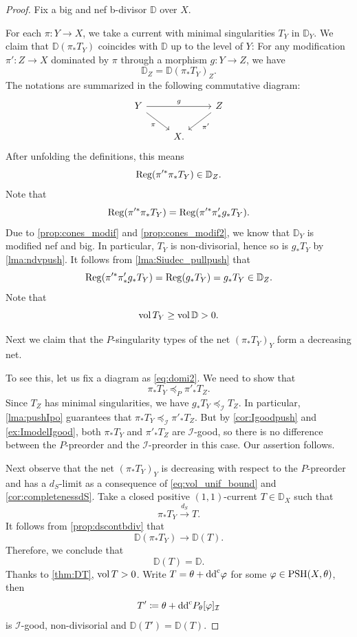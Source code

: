 \begin{proof}
    Fix a big and nef b-divisor $\mathbb{D}$ over $X$.

    For each $\pi\colon Y\rightarrow X$, we take a current with minimal singularities $T_Y$ in $\mathbb{D}_Y$.
    We claim that $\mathbb{D}(\pi_*T_Y)$ coincides with $\mathbb{D}$ up to the level of $Y$: For any modification $\pi'\colon Z\rightarrow X$ dominated by $\pi$ through a morphism $g\colon Y\rightarrow Z$, we have
    \[
    \mathbb{D}_Z=\mathbb{D}(\pi_*T_Y)_Z.
    \]
    The notations are summarized in the following commutative diagram:
    \begin{equation}\label{eq:domi2}
    \begin{tikzcd}
Y \arrow[rr,"g"] \arrow[rd, "\pi"'] &   & Z \arrow[ld, "\pi'"] \\
                                 & X. &
\end{tikzcd}
    \end{equation}
    After unfolding the definitions, this means
    \[
        \operatorname{Reg}(\pi'^*\pi_*T_Y)\in \mathbb{D}_Z.
    \]
    Note that
    \[
        \operatorname{Reg}(\pi'^*\pi_*T_Y)=\operatorname{Reg}(\pi'^* \pi'_* g_*T_Y).
    \]
    Due to \cref{prop:cones_modif} and \cref{prop:cones_modif2}, we know that $\mathbb{D}_Y$ is modified nef and big. In particular, $T_Y$ is non-divisorial, hence so is $g_*T_Y$ by \cref{lma:ndvpush}. It follows from \cref{lma:Siudec_pullpush} that
    \[
    \operatorname{Reg}(\pi'^* \pi'_* g_*T_Y)=\operatorname{Reg}(g_*T_Y)=g_*T_Y\in \mathbb{D}_Z.
    \]
    Note that
    \begin{equation}\label{eq:vol_unif_bound}
    \operatorname{vol} T_Y\geq \operatorname{vol} \mathbb{D}>0.
    \end{equation}

    Next we claim that the $P$-singularity types of the net $(\pi_*T_Y)_Y$ form a decreasing net.

    To see this, let us fix a diagram as \eqref{eq:domi2}. We need to show that
    \[
    \pi_*T_Y\preceq_P \pi'_*T_Z.
    \]
    Since $T_Z$ has minimal singularities, we have $g_*T_Y\preceq_{\mathcal{I}} T_Z$. In particular, \cref{lma:pushIpo} guarantees that $\pi_*T_Y\preceq_{\mathcal{I}} \pi'_*T_Z$.
    But by \cref{cor:Igoodpush} and \cref{ex:ImodelIgood}, both $\pi_*T_Y$ and $\pi'_*T_Z$ are $\mathcal{I}$-good, so there is no difference between the $P$-preorder and the $\mathcal{I}$-preorder in this case. Our assertion follows.

    Next observe that the net $(\pi_*T_Y)_Y$ is decreasing with respect to the $P$-preorder and has a $d_S$-limit as a consequence of \eqref{eq:vol_unif_bound} and \cref{cor:completenessdS}.
    Take a closed positive $(1,1)$-current $T\in \mathbb{D}_X$ such that
    \[
    \pi_*T_Y\xrightarrow{d_S}T.
    \]
    It follows from \cref{prop:dscontbdiv} that
    \[
    \mathbb{D}(\pi_*T_Y)\to \mathbb{D}(T).
    \]
    Therefore, we conclude that
    \[
    \mathbb{D}(T)=\mathbb{D}.
    \]
    Thanks to \cref{thm:DT}, $\operatorname{vol} T>0$. Write $T=\theta+\mathrm{dd}^{\mathrm{c}} \varphi$ for some $\varphi\in \mathrm{PSH}(X,\theta)$, then
    \[
    T'\coloneqq \theta+\mathrm{dd}^{\mathrm{c}} P_{\theta}[\varphi]_{\mathcal{I}}
    \]
    is $\mathcal{I}$-good, non-divisorial and $\mathbb{D}(T')=\mathbb{D}(T)$.
\end{proof}

